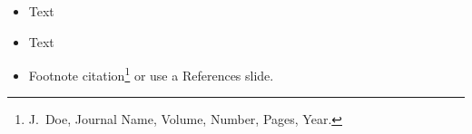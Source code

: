 \begin{itemize}
	\item Text \cite{cite1}
	\item Text
	\item Footnote citation\footnote{J.~Doe, Journal Name, Volume, Number, Pages, Year.} or use a References slide.
\end{itemize}
